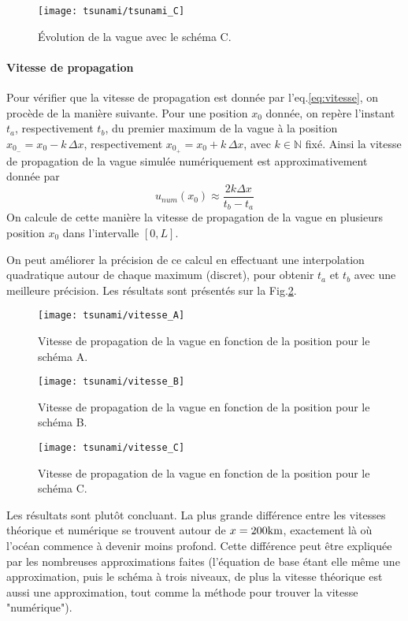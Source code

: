\documentclass[a4paper,12pt,oneside]{article}
\def \be {\begin{equation}}
\def \ee {\end{equation}}
\def \dx  {\Delta x}
\begin{document}
\begin{figure}[H]
    \centering
    \texttt{[image: tsunami/tsunami\_C]}
    \caption{Évolution de la vague avec le schéma C.}
    \label{fig:tsunami_C}
\end{figure}

\paragraph{Vitesse de propagation}
Pour vérifier que la vitesse de propagation est donnée par l'eq.\eqref{eq:vitesse}, on procède de la manière suivante. Pour une position $x_0$ donnée, on repère l'instant $t_a$, respectivement $t_b$, du premier maximum de la vague à la position $x_{0_-}=x_0-k\, \dx$, respectivement $x_{0_+}=x_0+k\, \dx$, avec $k \in \mathbb{N}$ fixé.
Ainsi la vitesse de propagation de la vague simulée numériquement est approximativement donnée par 
\be
u_{num}(x_0) \approx \frac{2 k \dx}{t_b-t_a}
\ee
On calcule de cette manière la vitesse de propagation de la vague en plusieurs position $x_0$ dans l'intervalle $[0,L]$.

On peut améliorer la précision de ce calcul en effectuant une interpolation quadratique autour de chaque maximum (discret), pour obtenir $t_a$ et $t_b$ avec une meilleure précision. Les résultats sont présentés sur la Fig.\ref{fig:vitesse_A}. 

\begin{figure}[H]
    \centering
    \texttt{[image: tsunami/vitesse\_A]}
    \caption{Vitesse de propagation de la vague en fonction de la position pour le schéma A.}
    \label{fig:vitesse_A}
\end{figure}

\begin{figure}[H]
    \centering
    \texttt{[image: tsunami/vitesse\_B]}
    \caption{Vitesse de propagation de la vague en fonction de la position pour le schéma B.}
    \label{fig:vitesse_B}
\end{figure}

\begin{figure}[H]
    \centering
    \texttt{[image: tsunami/vitesse\_C]}
    \caption{Vitesse de propagation de la vague en fonction de la position pour le schéma C.}
    \label{fig:vitesse_C}
\end{figure}

Les résultats sont plutôt concluant. La plus grande différence entre les vitesses théorique et numérique se trouvent autour de $x=200 \rm km$, exactement là où l'océan commence à devenir moins profond. Cette différence peut être expliquée par les nombreuses approximations faites (l'équation de base étant elle même une approximation, puis le schéma à trois niveaux, de plus la vitesse théorique est aussi une approximation, tout comme la méthode pour trouver la vitesse "numérique").
\end{document}
